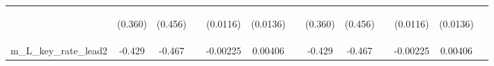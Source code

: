 \documentclass[]{article}
\begin{document}
\begin{center}
\begin{tabular}{lcccccccccccc}
\vspace{4pt} & \begin{footnotesize}(0.360)\end{footnotesize} & \begin{footnotesize}(0.456)\end{footnotesize} & \begin{footnotesize}\end{footnotesize} & \begin{footnotesize}(0.0116)\end{footnotesize} & \begin{footnotesize}(0.0136)\end{footnotesize} & \begin{footnotesize}\end{footnotesize} & \begin{footnotesize}(0.360)\end{footnotesize} & \begin{footnotesize}(0.456)\end{footnotesize} & \begin{footnotesize}\end{footnotesize} & \begin{footnotesize}(0.0116)\end{footnotesize} & \begin{footnotesize}(0.0136)\end{footnotesize} & \begin{footnotesize}\end{footnotesize} \\
m\_L\_key\_rate\_lead2 & -0.429 & -0.467 &  & -0.00225 & 0.00406 &  & -0.429 & -0.467 &  & -0.00225 & 0.00406 &  \\

\end{tabular}
\end{center}
\end{document}
